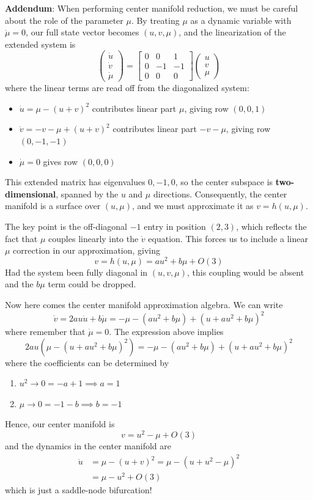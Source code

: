 \documentclass{article}
\begin{document}
\begin{mdframed}
\textbf{Addendum}: When performing center manifold reduction, we must be careful about 
the role of the parameter $\mu$. By treating $\mu$ as a dynamic variable 
with $\dot{\mu} = 0$, our full state vector becomes $(u, v, \mu)$, and 
the linearization of the extended system is
\[
\begin{pmatrix}\dot{u} \\ \dot{v} \\ \dot{\mu}\end{pmatrix} = 
\begin{bmatrix} 0 & 0 & 1\\ 0 & -1 & -1 \\ 0 & 0 & 0 \end{bmatrix}
\begin{pmatrix}u \\ v \\ \mu\end{pmatrix}
\]
where the linear terms are read off from the diagonalized system:
\begin{itemize}
    \item $\dot{u} = \mu - (u+v)^2$ contributes linear part $\mu$, giving row $(0,0,1)$
    \item $\dot{v} = -v - \mu + (u+v)^2$ contributes linear part $-v - \mu$, giving row $(0,-1,-1)$
    \item $\dot{\mu} = 0$ gives row $(0,0,0)$
\end{itemize}
This extended matrix has eigenvalues $0, -1, 0$, so the center subspace 
is \textbf{two-dimensional}, spanned by the $u$ and $\mu$ directions. 
Consequently, the center manifold is a surface over $(u,\mu)$, and we 
must approximate it as $v = h(u, \mu)$.

The key point is the off-diagonal $-1$ entry in position $(2,3)$, which 
reflects the fact that $\mu$ couples linearly into the $\dot{v}$ equation. 
This forces us to include a linear $\mu$ correction in our approximation, giving
\[
v = h(u,\mu) = au^2 + b\mu + O(3)
\]
Had the system been fully diagonal in $(u, v, \mu)$, this coupling would 
be absent and the $b\mu$ term could be dropped.
\end{mdframed}
Now here comes the center manifold approximation algebra. We can write
\[
\dot{v}= 2au\dot{u} + b \dot{\mu}= - \mu - (au^2 + b\mu) + \left( u+ au^2 + b\mu \right)^2
\]
where remember that $\dot{\mu}=0$. The expression above implies 
\[
2au\left(\mu - \left( u+ au^2 + b\mu \right)^2 \right) = - \mu - (au^2 + b\mu) + \left( u+ au^2 + b\mu \right)^2
\]
where the coefficients can be determined by 
\begin{enumerate}
    \item $u^2\longrightarrow 0=-a+1\implies a=1$
    \item $\mu\longrightarrow 0 = -1 - b \implies b=-1$
\end{enumerate}
Hence, our center manifold is 
\[
v = u^2 - \mu + O(3)
\]
and the dynamics in the center manifold are 
\begin{align*}
    \dot{u} &= \mu - (u+v)^2 = \mu - (u + u^2 - \mu)^2\\
    &= \mu - u^2 + O(3)
\end{align*}
which is just a saddle-node bifurcation!
\end{document}
